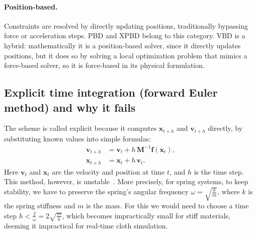 \paragraph{Position-based.}
Constraints are resolved by directly updating positions, traditionally bypassing force
or acceleration steps. PBD and XPBD belong to this category. VBD is a
hybrid: mathematically it is a position-based solver, since it directly updates
positions, but it does so by solving a local optimization problem that mimics a
force-based solver, so it is force-based in its physical formulation.

\subsection{Explicit time integration (forward Euler method) and why it fails}
\label{ssec:ExplicitEuler}
The scheme is called explicit because it computes $\mathbf{x}_{t+h}$ and
$\mathbf{v}_{t+h}$ directly, by substituting known values into simple formulas:
\begin{align}
    \mathbf{v}_{t+h} &= \mathbf{v}_t + h\,\mathbf{M}^{-1}\mathbf{f}(\mathbf{x}_t), \\
    \mathbf{x}_{t+h} &= \mathbf{x}_t + h\,\mathbf{v}_t.
\end{align}
Here $\mathbf{v}_t$ and $\mathbf{x}_t$ are the velocity and position at time $t$,
and $h$ is the time step. This method, however, is unstable~\cite{10.1145/280814.280821}.
More precisely, for spring systems, to keep stability, we have to preserve the spring's
angular frequency $\omega = \sqrt{\frac{k}{m}}$, where $k$ is the spring stiffness and $m$ is the mass.
For this we would need to choose a time step $h < \frac{2}{\omega} = 2\sqrt{\frac{m}{k}}$, which becomes impractically small
for stiff materials, deeming it impractical for real-time cloth simulation.

